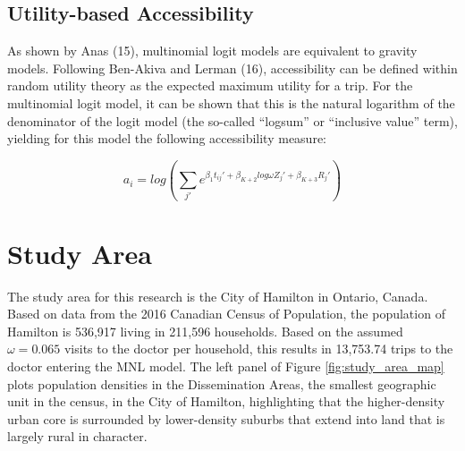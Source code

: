 \documentclass{article}
\begin{document}
\hypertarget{utility-based-accessibility}{%
\subsection{Utility-based
Accessibility}\label{utility-based-accessibility}}

As shown by Anas (15), multinomial logit models are equivalent to
gravity models. Following Ben-Akiva and Lerman (16), accessibility can
be defined within random utility theory as the expected maximum utility
for a trip. For the multinomial logit model, it can be shown that this
is the natural logarithm of the denominator of the logit model (the
so-called ``logsum'' or ``inclusive value'' term), yielding for this
model the following accessibility measure:

\[
a_i = log(\sum_{j\prime} e^{\beta_1 t_{ij}\prime + \beta_{K+2} log \omega Z_j\prime + \beta_{K + 3} R_j\prime})
\]

\hypertarget{study-area}{%
\section{Study Area}\label{study-area}}

The study area for this research is the City of Hamilton in Ontario,
Canada. Based on data from the 2016 Canadian Census of Population, the
population of Hamilton is 536,917 living in 211,596 households. Based on
the assumed \(\omega = 0.065\) visits to the doctor per household, this
results in 13,753.74 trips to the doctor entering the MNL model. The
left panel of Figure \ref{fig:study_area_map} plots population densities
in the Dissemination Areas, the smallest geographic unit in the census,
in the City of Hamilton, highlighting that the higher-density urban core
is surrounded by lower-density suburbs that extend into land that is
largely rural in character.
\end{document}
